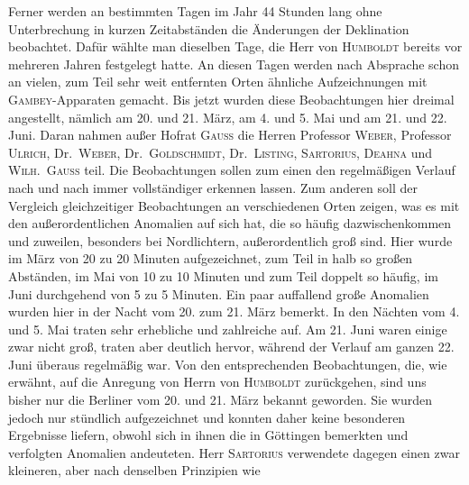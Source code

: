 Ferner werden an bestimmten Tagen im Jahr 44 Stunden lang ohne Unterbrechung in kurzen Zeitabständen die Änderungen der Deklination beobachtet. Dafür wählte man dieselben Tage, die Herr von \textsc{Humboldt} bereits vor mehreren Jahren festgelegt hatte. An diesen Tagen werden nach Absprache schon an vielen, zum Teil sehr weit entfernten Orten ähnliche Aufzeichnungen mit \textsc{Gambey}-Apparaten gemacht. Bis jetzt wurden diese Beobachtungen hier dreimal angestellt, nämlich am 20. und 21. März, am 4. und 5. Mai und am 21. und 22. Juni. Daran nahmen außer Hofrat \textsc{Gauss} die Herren Professor \textsc{Weber}, Professor \textsc{Ulrich}, Dr.\ \textsc{Weber}, Dr.\ \textsc{Goldschmidt}, Dr.\ \textsc{Listing}, \textsc{Sartorius}, \textsc{Deahna} und \textsc{Wilh.\ Gauss} teil. Die Beobachtungen sollen zum einen den regelmäßigen Verlauf nach und nach immer vollständiger erkennen lassen. Zum anderen soll der Vergleich gleichzeitiger Beobachtungen an verschiedenen Orten zeigen, was es mit den außerordentlichen Anomalien auf sich hat, die so häufig dazwischenkommen und zuweilen, besonders bei Nordlichtern, außerordentlich groß sind. Hier wurde im März von 20 zu 20 Minuten aufgezeichnet, zum Teil in halb so großen Abständen, im Mai von 10 zu 10 Minuten und zum Teil doppelt so häufig, im Juni durchgehend von 5 zu 5 Minuten. Ein paar auffallend große Anomalien wurden hier in der Nacht vom 20. zum 21. März bemerkt. In den Nächten vom 4. und 5. Mai traten sehr erhebliche und zahlreiche auf. Am 21. Juni waren einige zwar nicht groß, traten aber deutlich hervor, während der Verlauf am ganzen 22. Juni überaus regelmäßig war. Von den entsprechenden Beobachtungen, die, wie erwähnt, auf die Anregung von Herrn von \textsc{Humboldt} zurückgehen, sind uns bisher nur die Berliner vom 20. und 21. März bekannt geworden. Sie wurden jedoch nur stündlich aufgezeichnet und konnten daher keine besonderen Ergebnisse liefern, obwohl sich in ihnen die in Göttingen bemerkten und verfolgten Anomalien andeuteten. Herr \textsc{Sartorius} verwendete dagegen einen zwar kleineren, aber nach denselben Prinzipien wie
